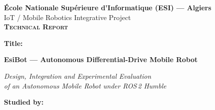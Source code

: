 \begin{titlepage}
\begin{center}
{\large \bfseries{École Nationale Supérieure d'Informatique (ESI) --- Algiers}}\\[0.3cm]
{\small IoT / Mobile Robotics Integrative Project}\\[0.3cm]
\vspace{0.5cm}
\textsc{\huge\textbf{Technical Report}}
\end{center}
\vspace{2mm}
\begin{center}
\begin{flushleft}
    \hspace{0.3cm}
    \begin{tcolorbox}[width=2cm,  colframe=yellowgreen, colback=white, boxsep=0mm, arc=1mm]
    {\bfseries{Title:}\\ }
     \vspace{-5mm}
    \end{tcolorbox}
    \vspace{-2mm}
\end{flushleft}
       \begin{tcolorbox}[width=.96\linewidth,  colframe=black, colback=white, boxsep=6mm, arc=3mm]
        \centering \huge \textbf{EsiBot --- Autonomous Differential-Drive Mobile Robot}
    \end{tcolorbox}
        \vspace{0.1cm}
    \vspace{0.2cm}
\end{center}

\begin{center}
	{\normalsize\itshape
		Design, Integration and Experimental Evaluation\\
		of an Autonomous Mobile Robot under ROS\,2 Humble}
\end{center}

\vspace{0.5cm}

\begin{flushleft}
    \begin{tcolorbox}[width=3.5cm,  colframe=yellowgreen, colback=white, boxsep=0mm, arc=1mm]
    {\bfseries{Studied by:}\\ }
     \vspace{-5mm}
    \end{tcolorbox}
    \vspace{-7mm}
\end{flushleft}


\end{titlepage}
